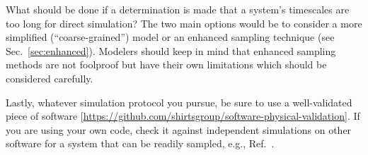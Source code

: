 What should be done if a determination is made that a system's timescales are too long for direct simulation?
The two main options would be to consider a more simplified (``coarse-grained'') model \cite{Merchant2011,Kmiecik2016} or an enhanced sampling technique (see Sec.~\ref{sec:enhanced}).
Modelers should keep in mind that enhanced sampling methods are not foolproof but have their own limitations which should be considered carefully.

Lastly, whatever simulation protocol you pursue, be sure to use a well-validated piece of software [\url{https://github.com/shirtsgroup/software-physical-validation}].
If you are using your own code, check it against independent simulations on other software for a system that can be readily sampled, e.g., Ref.~\cite{NIST_SRSW}.

